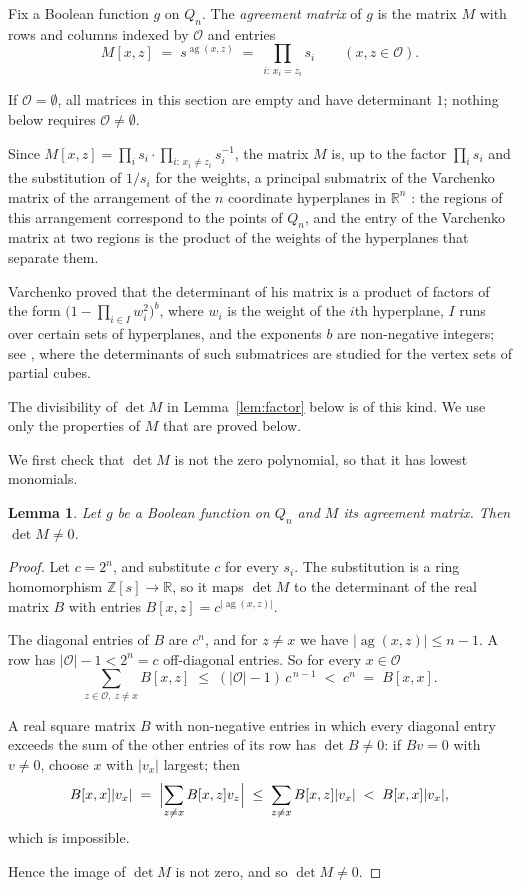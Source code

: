 \documentclass[11pt,reqno]{amsart}
\newtheorem{lemma}[theorem]{Lemma}
\theoremstyle{definition}
\theoremstyle{remark}
\numberwithin{equation}{section}
\theoremstyle{named}
\theoremstyle{plain}
\newcommand{\R}{\mathbb{R}}
\newcommand{\Z}{\mathbb{Z}}
\newcommand{\ag}{\operatorname{ag}}
\newcommand{\cO}{\mathcal{O}}
\newcommand{\abs}[1]{\lvert #1\rvert}
\begin{document}
Fix a Boolean function $g$ on $Q_n$. The \emph{agreement matrix} of $g$ is the matrix $M$ with rows
and columns indexed by $\cO$ and entries
\[
   M[x,z]\;=\;s^{\ag(x,z)}\;=\;\prod_{i:\,x_i=z_i}s_i\qquad(x,z\in\cO).
\]

If $\cO=\emptyset$, all matrices in this section are empty and have determinant $1$; nothing below
requires $\cO\ne\emptyset$.

Since $M[x,z]=\prod_{i}s_i\cdot\prod_{i:\,x_i\ne z_i}s_i^{-1}$, the matrix $M$ is, up to the factor
$\prod_is_i$ and the substitution of $1/s_i$ for the weights, a principal submatrix of the Varchenko
matrix of the arrangement of the $n$ coordinate hyperplanes in $\R^{n}$ \cite{Var}: the regions of
this arrangement correspond to the points of $Q_n$, and the entry of the Varchenko matrix at two
regions is the product of the weights of the hyperplanes that separate them.

Varchenko proved that the determinant of his matrix is a product of factors of the form
$\bigl(1-\prod_{i\in I}w_i^{2}\bigr)^{b}$, where $w_i$ is the weight of the $i$th hyperplane, $I$
runs over certain sets of hyperplanes, and the exponents $b$ are non-negative integers; see
\cite{HKY}, where the determinants of such submatrices are studied for the vertex sets of partial
cubes.

The divisibility of $\det M$ in
Lemma~\ref{lem:factor} below is of this kind. We use only the properties of $M$ that are proved
below.

We first check that $\det M$ is not the zero polynomial, so that it has lowest monomials.

\begin{lemma}\label{lem:nonzero}
Let $g$ be a Boolean function on $Q_n$ and $M$ its agreement matrix. Then \mbox{$\det M\ne0$}.
\end{lemma}

\begin{proof}
Let $c=2^{n}$, and substitute $c$ for every $s_i$. The substitution is a ring homomorphism
$\Z[s]\to\R$, so it maps $\det M$ to the determinant of the real matrix $B$ with entries
$B[x,z]=c^{\abs{\ag(x,z)}}$.

The diagonal entries of $B$ are $c^{n}$, and for $z\ne x$ we have
$\abs{\ag(x,z)}\le n-1$. A row has $\abs{\cO}-1<2^{n}=c$ off-diagonal entries. So for every $x\in\cO$
\[
   \sum_{z\in\cO,\ z\ne x}B[x,z]\;\le\;(\abs{\cO}-1)\,c^{\,n-1}\;<\;c^{n}\;=\;B[x,x].
\]

A real square matrix $B$ with non-negative entries in which every diagonal entry exceeds the sum
of the other entries of its row has $\det B\ne0$: if $Bv=0$ with $v\ne0$, choose $x$ with $\abs{v_x}$
largest; then
\[
   B[x,x]\abs{v_x}\;=\;\Bigl\lvert\sum_{z\ne x}B[x,z]v_z\Bigr\rvert\;\le\;\sum_{z\ne x}B[x,z]\abs{v_x}
   \;<\;B[x,x]\abs{v_x},
\]
which is impossible.

Hence the image of $\det M$ is not zero, and so $\det M\ne0$.
\end{proof}
\end{document}
